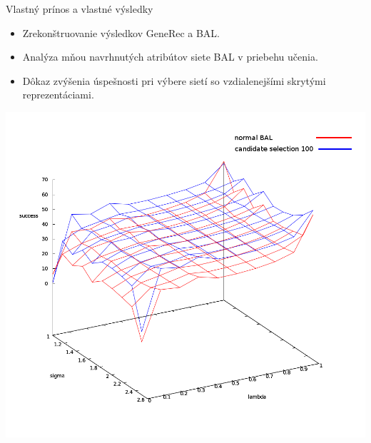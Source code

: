 \documentclass[xcolor=dvipsnames]{beamer}
\begin{document}
\begin{frame}{Vlastný prínos a vlastné výsledky}
  \begin{itemize}
    \item Zrekonštruovanie výsledkov GeneRec a BAL. 
    \item Analýza mňou navrhnutých atribútov siete BAL v priebehu učenia. 
    \item Dôkaz zvýšenia úspešnosti pri výbere sietí so vzdialenejšími skrytými reprezentáciami. 
  \end{itemize} 
  
  \begin{center}
    \includegraphics[scale=0.20]{img/compare_normal_and_hdist2.png}
  \end{center} 
\end{frame}
\end{document}
